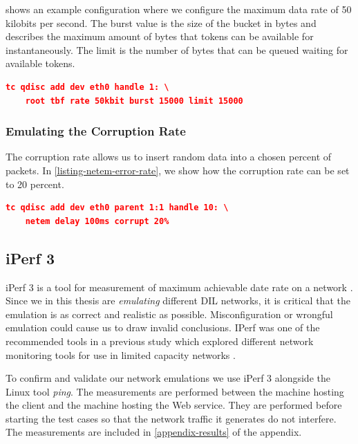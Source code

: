  shows an example configuration where we configure
the maximum data rate of 50 kilobits per second. The burst value is the size of
the bucket in bytes and describes the maximum amount of bytes that tokens can be
available for instantaneously. The limit is the number of bytes that can be
queued waiting for available tokens.

\begin{lstlisting}[frame=single, language=json, caption="Emulating the data rate", label=listing-netem-data-rate]
  tc qdisc add dev eth0 handle 1: \
    root tbf rate 50kbit burst 15000 limit 15000
\end{lstlisting}

\subsubsection{Emulating the Corruption Rate}

The corruption rate allows us to insert random data into a chosen percent of
packets. In \cref{listing-netem-error-rate}, we show how the corruption rate can
be set to 20 percent.

\begin{lstlisting}[frame=single, language=json, caption="Emulating the corruption rate", label=listing-netem-error-rate]
  tc qdisc add dev eth0 parent 1:1 handle 10: \
    netem delay 100ms corrupt 20%
\end{lstlisting}


\subsection{iPerf 3}

iPerf 3 is a tool for measurement of maximum achievable date rate on a network
\cite{iperf3-homepage}. Since we in this thesis are \textit{emulating} different
DIL networks, it is critical that the emulation is as correct and realistic as
possible. Misconfiguration or wrongful emulation could cause us to draw invalid
conclusions. IPerf was one of the recommended tools in a previous study which
explored different network monitoring tools for use in limited capacity
networks \cite{bloebaum-monitoring}.

To confirm and validate our network emulations we use iPerf 3 alongside the
Linux tool \textit{ping}. The measurements are performed between the machine
hosting the client and the machine hosting the Web service. They are performed
before starting the test cases so that the network traffic it generates do not
interfere. The measurements are included in \cref{appendix-results} of the
appendix.


